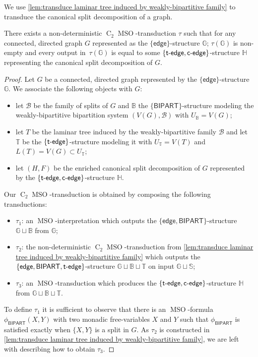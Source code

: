 \documentclass{lmcs} %
\newcommand{\MSO}{\ensuremath{\operatorname{MSO}}\xspace}
\newcommand{\CMSO}[1][]{\ensuremath{\C[#1]{\!\!}\MSO}\xspace}
\newcommand{\C}[1][]{\ensuremath{\operatorname{C}_{#1}}\xspace}
\newcommand{\edge}{\ensuremath{\mathsf{edge}}\xspace}
\newcommand{\tedge}{\ensuremath{\mathsf{t}\text-\mathsf{edge}}\xspace}
\newcommand{\cedge}{\ensuremath{\mathsf{c}\text-\mathsf{edge}}\xspace}
\newcommand{\BIPARTITION}{\ensuremath{\mathsf{BIPART}}\xspace}
\newcommand{\splitSet}{\ensuremath{\mathcal{B}}}
\begin{document}
We use \autoref{lem:transduce laminar tree induced by weakly-bipartitive family} to transduce the canonical split decomposition of a graph.
\begin{thm}\label{thm:split}
    There exists a non-deterministic \CMSO[2]-transduction $\tau$
    such that for any connected, directed graph $G$ represented as the $\{\edge\}$-structure $\mathbb{G}$;
    $\tau(\mathbb{G})$ is non-empty
    and every output in~$\tau(\mathbb{G})$ is equal to some $\{\tedge,\cedge\}$-structure $\mathbb{H}$
    representing the canonical split decomposition of $G$.
\end{thm}
\begin{proof}
    Let $G$ be a connected, directed graph represented by the $\{\edge\}$-structure $\mathbb{G}$. We associate the following objects with $G$:
    \begin{itemize}
        \item let $\splitSet$ be the family of splits of $G$ and $\mathbb{B}$ the $\{\BIPARTITION\}$-structure modeling the weakly-bipartitive bipartition system $(V(G),\splitSet)$ with $U_\mathbb{B}=V(G)$;
        \item let $T$ be the laminar tree induced by the weakly-bipartitive family $\splitSet$ and let $\mathbb{T}$ be the $\{\tedge\}$-structure modeling it with $U_\mathbb{T}=V(T)$ and $L(T)=V(G)\subset U_\mathbb{T}$;
        \item let $(H,F)$ be the enriched canonical split decomposition of $G$ represented by the $\{\tedge,\cedge\}$-structure $\mathbb{H}$.
    \end{itemize}
    Our \CMSO[2]-transduction is obtained by composing the following transductions:
    \begin{itemize}
        \item $\tau_1$: an \MSO-interpretation which outputs the $\{\edge,\BIPARTITION\}$-structure $\mathbb{G}\sqcup \mathbb{B}$ from $\mathbb{G}$;
        \item $\tau_2$: the non-deterministic \CMSO[2]-transduction from \autoref{lem:transduce laminar tree induced by weakly-bipartitive family} which outputs the $\{\edge,\BIPARTITION, \tedge\}$-structure $\mathbb{G}\sqcup \mathbb{B}\sqcup \mathbb{T}$ on input $\mathbb{G}\sqcup \mathbb{S}$;
        \item $\tau_3$: an \MSO-transduction which produces the $\{\tedge,\cedge\}$-structure $\mathbb{H}$ from $\mathbb{G}\sqcup \mathbb{B}\sqcup \mathbb{T}$.
    \end{itemize}
    To define $\tau_1$ it is sufficient to observe that there is an \MSO-formula $\phi_{\BIPARTITION}(X,Y)$ with two monadic free-variables $X$ and $Y$ such that $\phi_{\BIPARTITION}$ is satisfied exactly when $\{X,Y\}$ is a split in $G$. As $\tau_2$ is constructed in \autoref{lem:transduce laminar tree induced by weakly-bipartitive family}, we are left with describing how to obtain $\tau_3$.

\end{proof}
\end{document}
